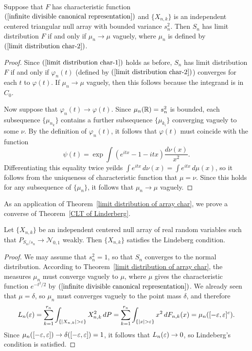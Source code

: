 \begin{theorem}\label{limit distribution of array char}
Suppose that $F$ has characteristic function $(\ref{infinite divisible canonical representation})$ and $\{X_{n,k}\}$ is an independent centered triangular null array with bounded variance $s_n^2$. Then $S_n$ has limit distribution $F$ if and only if $\mu_n\to\mu$ vaguely, where $\mu_n$ is defined by $(\ref{limit distribution char-2})$.
\end{theorem}
\begin{proof}
Since $(\ref{limit distribution char-1})$ holds as before, $S_n$ has limit distribution $F$ if and only if $\varphi_n(t)$ (defined by $(\ref{limit distribution char-2})$) converges for each $t$ to $\varphi(t)$. If $\mu_n\to\mu$ vaguely, then this follows because the integrand is in $C_0$.\par
Now suppose that $\varphi_n(t)\to\varphi(t)$. Since $\mu_n(\mathbb{R})=s_n^2$ is bounded, each subsequence $\{\mu_{n_k}\}$ contains a further subsequence $\{\mu_{k_i}\}$ converging vaguely to some $\nu$. By the definition of $\varphi_n(t)$, it follows that $\varphi(t)$ must coincide with the function
\[\psi(t)=\exp\int(e^{itx}-1-itx)\frac{d\nu(x)}{x^2}.\]
Differentiating this equality twice yeilds $\int e^{itx}\,d\nu(x)=\int e^{itx}\,d\mu(x)$, so it follows from the uniqueness of characteristic function that $\mu=\nu$. Since this holds for any subsequence of $\{\mu_n\}$, it follows that $\mu_n\to\mu$ vaguely.
\end{proof}
As an application of Theorem~\ref{limit distribution of array char}, we prove a converse of Theorem~\ref{CLT of Linderberg}.
\begin{corollary}
Let $\{X_{n,k}\}$ be an independent centered null array of real random variables such that $P_{S_n/s_n}\to \mathcal{N}_{0,1}$ weakly. Then $\{X_{n,k}\}$ satisfies the Lindeberg condition.
\end{corollary}
\begin{proof}
We may assume that $s_n^2=1$, so that $S_n$ converges to the normal distribution. According to Theorem~\ref{limit distribution of array char}, the measures $\mu_n$ must converge vaguely to $\mu$, where $\mu$ gives the characteristic function $e^{-t^2/2}$ by $(\ref{infinite divisible canonical representation})$. We already seen that $\mu=\delta$, so $\mu_n$ must converges vaguely to the point mass $\delta$, and therefore
\[L_n(\eps)=\sum_{k=1}^{r_n}\int_{\{|X_{n,k}|>\eps\}}X_{n,k}^2\,dP=\sum_{k=1}^{r_n}\int_{\{|x|>\eps\}}x^2\,dF_{n,k}(x)=\mu_n([-\eps,\eps]^c).\]
Since $\mu_n([-\varepsilon,\varepsilon])\to\delta([-\varepsilon,\varepsilon])=1$, it follows that $L_n(\varepsilon)\to 0$, so Lindeberg's condition is satisfied.
\end{proof}
